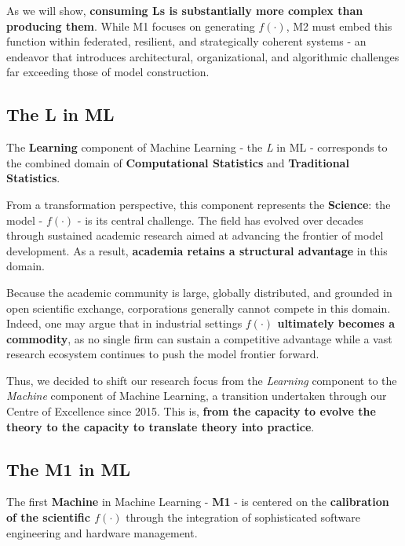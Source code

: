 \documentclass{article}
\begin{document}
As we will show, \textbf{consuming Ls is substantially more complex than producing them}. While M1 focuses on generating \begin{math} f(·)\end{math}, M2 must embed this function within federated, resilient, and strategically coherent systems - an endeavor that introduces architectural, organizational, and algorithmic challenges far exceeding those of model construction.\\


\subsection{The L in ML}
\label{subsection: The L in ML}

The \textbf{Learning} component of Machine Learning - the \textit{L} in ML - corresponds to the combined domain of \textbf{Computational Statistics} and \textbf{Traditional Statistics}.

From a transformation perspective, this component represents the \textbf{Science}: the model - \begin{math} f(·)\end{math} - is its central challenge. The field has evolved over decades through sustained academic research aimed at advancing the frontier of model development. As a result, \textbf{academia retains a structural advantage} in this domain.

Because the academic community is large, globally distributed, and grounded in open scientific exchange, corporations generally cannot compete in this domain. Indeed, one may argue that in industrial settings \textbf{\begin{math} f(·)\end{math} ultimately becomes a commodity}, as no single firm can sustain a competitive advantage while a vast research ecosystem continues to push the model frontier forward. 

Thus, we decided to shift our research focus from the \textit{Learning} component to the \textit{Machine} component of Machine Learning, a transition undertaken through our Centre of Excellence since 2015. This is, \textbf{from the capacity to evolve the theory to the capacity to translate theory into practice}.\\



\subsection{The M1 in ML}
\label{subsection: The M1 in ML}
The first \textbf{Machine} in Machine Learning - \textbf{M1} - is centered on the \textbf{calibration of the scientific \begin{math} f(·)\end{math}} through the integration of sophisticated software engineering and hardware management.\\
\end{document}
